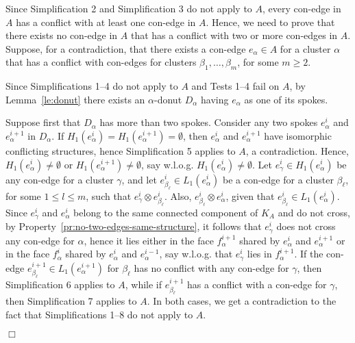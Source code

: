 \documentclass[letter,runningheads]{llncs}
\renewenvironment{proof}
{{\em Proof.\ }}{\hspace*{\fill}$\Box$\par\vspace{2mm}}
\newcommand{\conf}{\otimes}
\begin{document}
\begin{proof}
Since {\sc Simplification 2} and {\sc Simplification 3} do not apply to $A$, every con-edge in $A$ has a conflict with at least one con-edge in $A$. Hence, we need to prove that there exists no con-edge in $A$ that has a conflict with two or more con-edges in $A$. Suppose, for a contradiction, that there exists a con-edge $e_{\alpha}\in A$ for a cluster $\alpha$ that has a conflict with con-edges for clusters $\beta_1,\dots,\beta_m$, for some $m\geq 2$.

Since {\sc Simplifications 1--4} do not apply to $A$ and {\sc Tests 1--4} fail on $A$, by Lemma~\ref{le:donut} there exists an $\alpha$-donut $D_{\alpha}$ having $e_{\alpha}$ as one of its spokes.

Suppose first that $D_{\alpha}$ has more than two spokes. Consider any two spokes $e^i_{\alpha}$ and $e^{i+1}_{\alpha}$ in $D_{\alpha}$. If $H_1(e^i_{\alpha})=H_1(e^{i+1}_{\alpha})=\emptyset$, then $e^i_{\alpha}$ and $e^{i+1}_{\alpha}$ have isomorphic conflicting structures, hence {\sc Simplification 5} applies to $A$, a contradiction. Hence, $H_1(e^i_{\alpha})\neq \emptyset$ or $H_1(e^{i+1}_{\alpha})\neq \emptyset$, say w.l.o.g. $H_1(e^i_{\alpha})\neq \emptyset$. Let $e^i_{\gamma}\in H_1(e^i_{\alpha})$ be any con-edge for a cluster $\gamma$, and let $e^i_{\beta_\ell}\in L_1(e^i_{\alpha})$ be a con-edge for a cluster $\beta_\ell$, for some $1\leq l\leq m$, such that $e^i_{\gamma}\conf e^i_{\beta_\ell}$. Also, $e^i_{\beta_\ell} \conf e^i_{\alpha}$, given that $e^i_{\beta_\ell}\in L_1(e^i_{\alpha})$. Since $e^i_{\gamma}$ and $e^i_{\alpha}$ belong to the same connected component of $K_A$ and do not cross, by Property~\ref{pr:no-two-edges-same-structure}, it follows that $e^i_{\gamma}$ does not cross any con-edge for $\alpha$, hence it lies either in the face $f^{i+1}_{\alpha}$ shared by $e^i_{\alpha}$ and $e^{i+1}_{\alpha}$ or in the face $f^{i}_{\alpha}$ shared by $e^i_{\alpha}$ and $e^{i-1}_{\alpha}$, say w.l.o.g. that $e^i_{\gamma}$ lies in $f^{i+1}_{\alpha}$. If the con-edge $e^{i+1}_{\beta_\ell}\in L_1(e^{i+1}_{\alpha})$ for $\beta_\ell$ has no conflict with any con-edge for $\gamma$, then {\sc Simplification 6} applies to $A$, while if $e^{i+1}_{\beta_\ell}$ has a conflict with a con-edge for $\gamma$, then {\sc Simplification 7} applies to $A$. In both cases, we get a contradiction to the fact that {\sc Simplifications 1--8} do not apply to $A$.


\end{proof}
\end{document}
